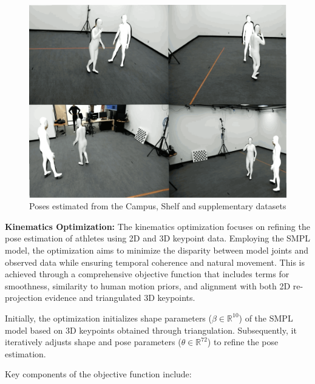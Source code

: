 \documentclass{egpubl}
\begin{document}
\begin{figure}[htb]
\begin{minipage}[b]{0.32\textwidth}
        \includegraphics[width=\linewidth]{figures/supp.png}
    \end{minipage}%
    \caption{Poses estimated from the Campus, Shelf and supplementary datasets}
    \label{fig:qualitative}
\end{figure}

\textbf{Kinematics Optimization:} The kinematics optimization focuses on refining the pose estimation of athletes using 2D and 3D keypoint data. Employing the SMPL model, the optimization aims to minimize the disparity between model joints and observed data while ensuring temporal coherence and natural movement. This is achieved through a comprehensive objective function that includes terms for smoothness, similarity to human motion priors, and alignment with both 2D re-projection evidence and triangulated 3D keypoints.

Initially, the optimization initializes shape parameters ($\beta \in \mathbb{R}^{10}$) of the SMPL model based on 3D keypoints obtained through triangulation. Subsequently, it iteratively adjusts shape and pose parameters ($\theta \in \mathbb{R}^{72}$) to refine the pose estimation.

Key components of the objective function include:
\end{document}
